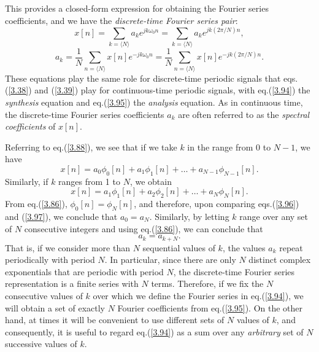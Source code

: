 \documentclass[a4paper,twoside]{book}
\begin{document}
This provides a closed-form expression for obtaining the Fourier series coefficients, and we have the \textit{discrete-time Fourier series pair}:
\begin{equation}
    x[n]=\sum_{k=\langle N\rangle}a_{k}e^{jk\omega_{0}n}=\sum_{k=\langle N\rangle}a_{k}e^{jk(2\pi/N)n},
    \label{3.94}
\end{equation}
\begin{equation}
    a_{k}=\frac{1}{N}\sum_{n=\langle N\rangle}x[n]e^{-jk\omega_{0}n}=\frac{1}{N}\sum_{n=\langle N\rangle}x[n]e^{-jk(2\pi/N)n}.
    \label{3.95}
\end{equation}
These equations play the same role for discrete-time periodic signals that eqs.\;(\ref{3.38}) and (\ref{3.39}) play for continuous-time periodic signals, with eq.\;(\ref{3.94}) the \textit{synthesis} equation and eq.\;(\ref{3.95}) the \textit{analysis} equation. As in continuous time, the discrete-time Fourier series coefficients $a_k$ are often referred to as the \textit{spectral coefficients} of $x[n]$.

Referring to eq.\;(\ref{3.88}), we see that if we take $k$ in the range from 0 to $N-1$, we have
\begin{equation}
    x[n]=a_0\phi_0[n]+a_1\phi_1[n]+\ldots+a_{N-1}\phi_{N-1}[n].
    \label{3.96}
\end{equation}
Similarly, if $k$ ranges from 1 to $N$, we obtain
\begin{equation}
    x[n]=a_1\phi_1[n]+a_2\phi_2[n]+\ldots+a_N\phi_N[n].
    \label{3.97}
\end{equation}
From eq.\;(\ref{3.86}), $\phi_0[n]=\phi_N[n]$, and therefore, upon comparing eqs.\;(\ref{3.96}) and (\ref{3.97}), we conclude that $a_0=a_N$. Similarly, by letting $k$ range over any set of $N$ consecutive integers and using eq.\;(\ref{3.86}), we can conclude that
\begin{equation}
    a_k=a_{k+N}.
    \label{3.98}
\end{equation}
That is, if we consider more than $N$ sequential values of $k$, the values $a_k$ repeat periodically with period $N$. In particular, since there are only $N$ distinct complex exponentials that are periodic with period $N$, the discrete-time Fourier series representation is a finite series with $N$ terms. Therefore, if we fix the $N$ consecutive values of $k$ over which we define the Fourier series in eq.\;(\ref{3.94}), we will obtain a set of exactly $N$ Fourier coefficients from eq.\;(\ref{3.95}). On the other hand, at times it will be convenient to use different sets of $N$ values of $k$, and consequently, it is useful to regard eq.\;(\ref{3.94}) as a sum over any \textit{arbitrary} set of $N$ successive values of $k$.
\end{document}
